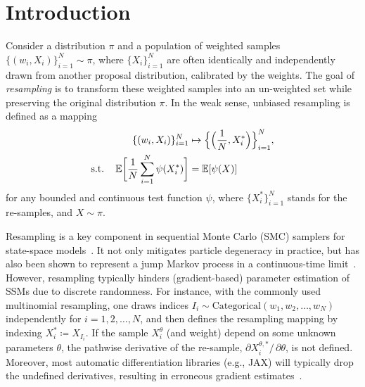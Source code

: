 \documentclass{article}
\begin{document}
\newcommand{\refmeasure}{\pi_{\mathrm{ref}}}

\begin{abstract}
This paper is concerned with differentiable resampling in the context of sequential Monte Carlo (e.g., particle filtering). 
Drawing on reparametrisation, we propose a new resampling method that is informative and instantly differentiable, based on a training-free diffusion model surrogate. 
We theoretically prove that our diffusion resampling method provides a consistent resampling distribution, and we show empirically that it outperforms the state-of-the-art differentiable resampling methods on multiple filtering and parameter estimation benchmarks. 
Finally, we show that it achieves competitive end-to-end performance when used in learning a complex dynamics-decoder model with high-dimensional image observations.
\end{abstract}

\section{Introduction}
\label{sec:intro}
Consider a distribution $\pi$ and a population of weighted samples $\lbrace (w_i, X_i) \rbrace_{i=1}^N \sim \pi$, where $\lbrace X_i \rbrace_{i=1}^N$ are often identically and independently drawn from another proposal distribution, calibrated by the weights. 
The goal of \emph{resampling} is to transform these weighted samples into an un-weighted set while preserving the original distribution $\pi$. 
In the weak sense, unbiased resampling is defined as a mapping
%
\begin{equation}
    \begin{split}
        \lbrace (w_i, X_i) \rbrace_{i=1}^N &\mapsto \Bigl\lbrace \Bigl(\frac{1}{N}, X_i^*\Bigr)\Bigr\rbrace_{i=1}^N, \\
        \text{s.t.} \quad \expecbigg{\frac{1}{N}\sum_{i=1}^N\psi(X_i^*)} &= \expec{\psi(X)}
    \end{split}
\end{equation}
%
for any bounded and continuous test function $\psi$, where $\lbrace X_i^* \rbrace_{i=1}^N$ stands for the re-samples, and $X\sim \pi$. 

Resampling is a key component in sequential Monte Carlo (SMC) samplers for state-space models~\citep[SSMs,][]{ChopinBook2020}.
It not only mitigates particle degeneracy in practice, but has also been shown to represent a jump Markov process in a continuous-time limit~\citep{Chopin2022PDMP}.
However, resampling typically hinders (gradient-based) parameter estimation of SSMs due to discrete randomness. 
For instance, with the commonly used multinomial resampling, one draws indices $I_i \sim \mathrm{Categorical}(w_1, w_2, \ldots, w_N)$ independently for $i=1,2,\ldots, N$, and then defines the resampling mapping by indexing $X^*_i \coloneqq X_{I_i}$. 
If the sample $X^\theta_i$ (and weight) depend on some unknown parameters $\theta$, the pathwise derivative of the re-sample, $\partial X_i^{\theta, *} / \, \partial \theta$, is not defined. 
Moreover, most automatic differentiation libraries (e.g., JAX) will typically drop the undefined derivatives, resulting in erroneous gradient estimates~\citep[see, e.g.,][]{Naesseth2018}. 
\end{document}
